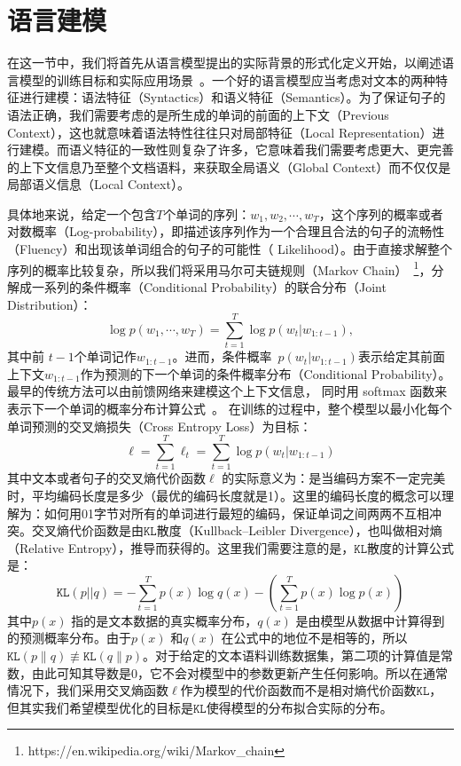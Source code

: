 \section{语言建模}
在这一节中，我们将首先从语言模型提出的实际背景的形式化定义开始，以阐述语言模型的训练目标和实际应用场景~。一个好的语言模型应当考虑对文本的两种特征进行建模：语法特征（Syntactics）和语义特征（Semantics）。为了保证句子的语法正确，我们需要考虑的是所生成的单词的前面的上下文（Previous Context），这也就意味着语法特性往往只对局部特征（Local Representation）进行建模。而语义特征的一致性则复杂了许多，它意味着我们需要考虑更大、更完善的上下文信息乃至整个文档语料，来获取全局语义（Global Context）而不仅仅是局部语义信息（Local Context）。


具体地来说，给定一个包含$T$个单词的序列：$w_1,w_2,\cdots,w_T$，这个序列的概率或者对数概率（Log-probability），即描述该序列作为一个合理且合法的句子的流畅性（Fluency）和出现该单词组合的句子的可能性（ Likelihood）。由于直接求解整个序列的概率比较复杂，所以我们将采用马尔可夫链规则（Markov Chain）~\footnote{https://en.wikipedia.org/wiki/Markov\_chain}，分解成一系列的条件概率（Conditional Probability）的联合分布（Joint Distribution）：
\begin{equation}
\label{laguage_model}
 \log p(w_1,\cdots, w_T ) = \sum_{t=1}^T \log p(w_t | w_{1:t-1}),
\end{equation}
其中前 $t-1$个单词记作$w_ {1:t-1}$。进而，条件概率~$p(w_t | w_ {1:t-1})$表示给定其前面上下文$w_ {1:t-1} $作为预测的下一个单词的条件概率分布（Conditional Probability）。最早的传统方法可以由前馈网络来建模这个上下文信息， 同时用 softmax 函数来表示下一个单词的概率分布计算公式~。 在训练的过程中，整个模型以最小化每个单词预测的交叉熵损失（Cross Entropy Loss）为目标：
\begin{equation}\label{equ:losses2}
  \ell=\sum_{t=1}^{T}\ell_t=\sum_{t=1}^{T}\log p(w_t | w_{1:t-1})
\end{equation}
其中文本或者句子的交叉熵代价函数$\ell$ 的实际意义为：是当编码方案不一定完美时，平均编码长度是多少（最优的编码长度就是1）。这里的编码长度的概念可以理解为：如何用01字节对所有的单词进行最短的编码，保证单词之间两两不互相冲突。交叉熵代价函数是由$\texttt{KL}$散度（Kullback–Leibler Divergence），也叫做相对熵（Relative Entropy），推导而获得的。这里我们需要注意的是，$\mathtt{KL}$散度的计算公式是：
\begin{equation}\label{equ:losses}
  \mathtt{KL}(p||q)=-\sum_{t=1}^{T}p(x)\log q(x) - (\sum_{t=1}^{T}p(x)\log p(x))
\end{equation}
其中$p(x)$ 指的是文本数据的真实概率分布，$q(x)$ 是由模型从数据中计算得到的预测概率分布。由于$p(x)$ 和$q(x)$ 在公式中的地位不是相等的，所以$\texttt{KL} (p\parallel q)\not\equiv \texttt{KL}(q\parallel p)$。对于给定的文本语料训练数据集，第二项的计算值是常数，由此可知其导数是0，它不会对模型中的参数更新产生任何影响。所以在通常情况下，我们采用交叉熵函数$\ell$作为模型的代价函数而不是相对熵代价函数$\mathtt{KL}$，但其实我们希望模型优化的目标是$\mathtt{KL}$使得模型的分布拟合实际的分布。
